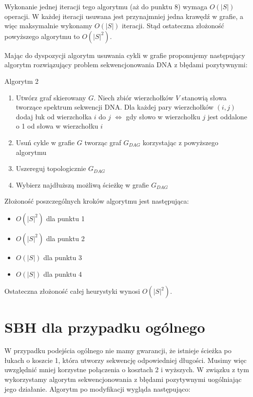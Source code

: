\documentclass[a4paper,10pt]{article}
\begin{document}
Wykonanie jednej iteracji tego algorytmu (aż do punktu 8) wymaga $O(|S|)$ operacji. W każdej
iteracji usuwana jest przynajmniej jedna krawędź w grafie, a więc maksymalnie wykonamy $O(|S|)$ iteracji. Stąd ostateczna złożoność powyższego
algorytmu to $O(|S|^2)$.

Mając do dyspozycji algorytm usuwania cykli w grafie proponujemy następujący algorytm rozwiązujący problem sekwencjonowania DNA z błędami pozytywnymi:

Algorytm 2
\begin{enumerate}
 \item Utwórz graf skierowany $G$. Niech zbiór wierzchołków $V$ stanowią słowa tworzące spektrum sekwencji DNA. Dla każdej pary 
 wierzchołków $(i,j)$ dodaj łuk od wierzchołka $i$ do $j$ $\iff$ gdy słowo w wierzchołku $j$ jest oddalone o 1 od słowa w wierzchołku $i$
 \item Usuń cykle w grafie $G$ tworząc graf $G_{DAG}$ korzystając z powyższego algorytmu
 \item Uszereguj topologicznie $G_{DAG}$
 \item Wybierz najdłuższą możliwą ścieżkę w grafie $G_{DAG}$
\end{enumerate}

Złożoność poszczególnych kroków algorytmu jest następująca:
\begin{itemize}
 \item $O(|S|^2)$ dla punktu 1
 \item $O(|S|^2)$ dla punktu 2
 \item $O(|S|)$ dla punktu 3
 \item $O(|S|)$ dla punktu 4
\end{itemize}

Ostateczna złożoność całej heurystyki wynosi $O(|S|^2)$.

\section{SBH dla przypadku ogólnego}
W przypadku podejścia ogólnego nie mamy gwarancji, że istnieje ścieżka po łukach o koszcie 1, która utworzy sekwencję odpowiedniej długości. 
Musimy więc uwzględnić mniej korzystne połączenia o kosztach 2 i wyższych. W związku z tym wykorzystamy algorytm sekwencjonowania z błędami 
pozytywnymi uogólniając jego działanie. Algorytm po modyfikacji wygląda następująco:
\end{document}
